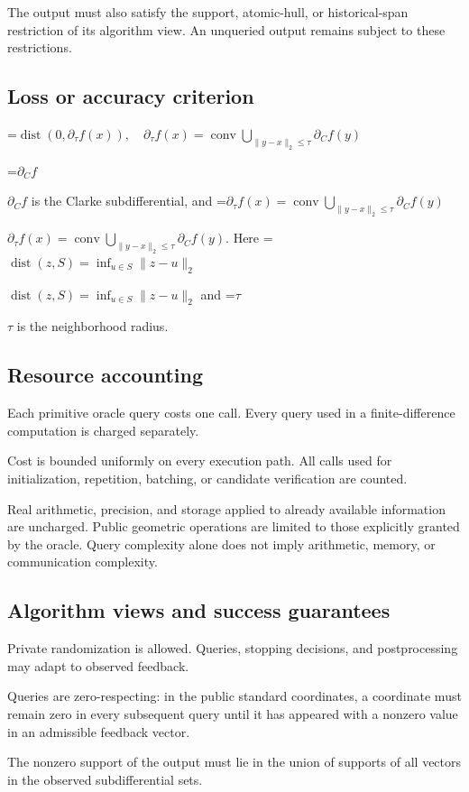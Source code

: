\documentclass[10pt,a4paper]{article}
\newcommand{\AtlasMath}[1]{\par\begingroup\centering\setbox0=\hbox{$\displaystyle #1$}\ifdim\wd0>1.4\linewidth\typeout{ATLAS WIDE FORMULA: \the\wd0}\fi\ifdim\wd0>\linewidth\resizebox{\linewidth}{!}{\box0}\else\box0\fi\par\endgroup}
\newcommand{\AtlasInlineMath}[1]{\begingroup\setbox0=\hbox{$#1$}\ifdim\wd0>.4\linewidth\endgroup\AtlasMath{#1}\else\endgroup$#1$\fi}
\begin{document}
The output must also satisfy the support, atomic-hull, or historical-span restriction of its algorithm view. An unqueried output remains subject to these restrictions.

\subsection{Loss or accuracy criterion}

\AtlasMath{\operatorname{dist}(0,\partial_\tau f(x)),\quad\partial_\tau f(x)=\operatorname{conv}\bigcup_{\|y-x\|_2\le\tau}\partial_C f(y)}


\AtlasInlineMath{\partial_C f} is the Clarke subdifferential, and \AtlasInlineMath{\partial_\tau f(x)=\operatorname{conv}\bigcup_{\|y-x\|_2\le\tau}\partial_C f(y)}. Here \AtlasInlineMath{\operatorname{dist}(z,S)=\inf_{u\in S}\|z-u\|_2} and \AtlasInlineMath{\tau} is the neighborhood radius.

\subsection{Resource accounting}
Each primitive oracle query costs one call. Every query used in a finite-difference computation is charged separately.

Cost is bounded uniformly on every execution path. All calls used for initialization, repetition, batching, or candidate verification are counted.

Real arithmetic, precision, and storage applied to already available information are uncharged. Public geometric operations are limited to those explicitly granted by the oracle. Query complexity alone does not imply arithmetic, memory, or communication complexity.

\subsection{Algorithm views and success guarantees}
Private randomization is allowed. Queries, stopping decisions, and postprocessing may adapt to observed feedback.

Queries are zero-respecting: in the public standard coordinates, a coordinate must remain zero in every subsequent query until it has appeared with a nonzero value in an admissible feedback vector.

The nonzero support of the output must lie in the union of supports of all vectors in the observed subdifferential sets.
\end{document}
